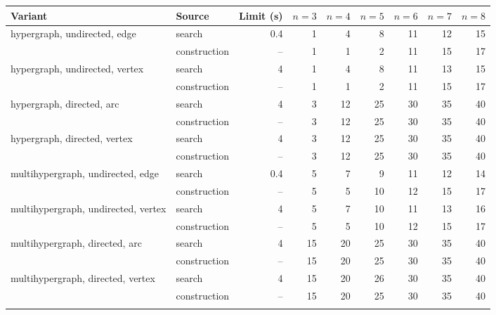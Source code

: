 \begin{tabular}{llrrrrrrr}
\toprule
Variant & Source & Limit (s) & $n=3$ & $n=4$ & $n=5$ & $n=6$ & $n=7$ & $n=8$ \\
\midrule
hypergraph, undirected, edge & search & 0.4 & 1 & 4 & 8 & 11 & 12 & 15 \\
 & construction & -- & 1 & 1 & 2 & 11 & 15 & 17 \\
\addlinespace[2pt]
hypergraph, undirected, vertex & search & 4 & 1 & 4 & 8 & 11 & 13 & 15 \\
 & construction & -- & 1 & 1 & 2 & 11 & 15 & 17 \\
\addlinespace[2pt]
hypergraph, directed, arc & search & 4 & 3 & 12 & 25 & 30 & 35 & 40 \\
 & construction & -- & 3 & 12 & 25 & 30 & 35 & 40 \\
\addlinespace[2pt]
hypergraph, directed, vertex & search & 4 & 3 & 12 & 25 & 30 & 35 & 40 \\
 & construction & -- & 3 & 12 & 25 & 30 & 35 & 40 \\
\addlinespace[2pt]
multihypergraph, undirected, edge & search & 0.4 & 5 & 7 & 9 & 11 & 12 & 14 \\
 & construction & -- & 5 & 5 & 10 & 12 & 15 & 17 \\
\addlinespace[2pt]
multihypergraph, undirected, vertex & search & 4 & 5 & 7 & 10 & 11 & 13 & 16 \\
 & construction & -- & 5 & 5 & 10 & 12 & 15 & 17 \\
\addlinespace[2pt]
multihypergraph, directed, arc & search & 4 & 15 & 20 & 25 & 30 & 35 & 40 \\
 & construction & -- & 15 & 20 & 25 & 30 & 35 & 40 \\
\addlinespace[2pt]
multihypergraph, directed, vertex & search & 4 & 15 & 20 & 26 & 30 & 35 & 40 \\
 & construction & -- & 15 & 20 & 25 & 30 & 35 & 40 \\
\addlinespace[2pt]
\bottomrule
\end{tabular}
